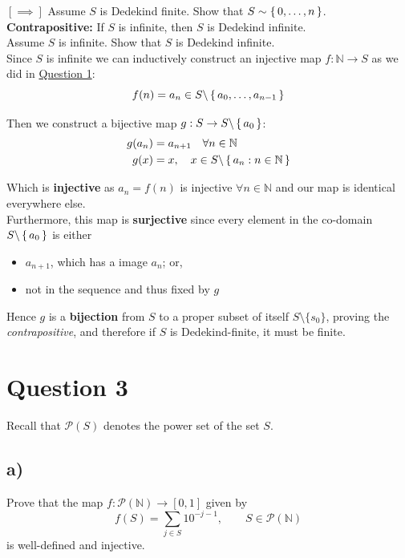 \documentclass[dvipsnames,12pt]{exam}
\newcommand{\N}{{\mathbb{N}}}
\renewcommand{\P}{{\mathcal{P}}} %
\begin{document}
\bigskip

$[\implies]$ Assume $S$ is Dedekind finite. Show that $S \sim \set{0, \ldots, n}$.\\

\textbf{Contrapositive:} If $S$ is infinite, then $S$ is Dedekind infinite.\\

Assume $S$ is infinite. Show that $S$ is Dedekind infinite.\\

Since $S$ is infinite we can inductively construct an injective map $f: \N \to S$ as we did in \hyperref[question1]{Question 1}:
$$f(n) = a_n \in S \backslash \set{a_0,\ldots,a_{n-1}}$$

Then we construct a bijective map $g:S \to S \backslash \set{a_0}$:
\begin{align}
    g(a_n) &= a_{n+1}\quad \forall n \in \N\\
    g(x) &= x, \quad x \in S \backslash \set{a_n: n\in \N}
\end{align}

Which is \textbf{injective} as $a_n = f(n)$ is injective $\forall n\in \N$ and our map is identical everywhere else.\\

Furthermore, this map is \textbf{surjective} since every element in the co-domain $S\backslash \set{a_0}$ is either
\begin{itemize}
    \item $a_{n+1}$, which has a image $a_n$; or,
    \item not in the sequence and thus fixed by $g$
\end{itemize}

Hence $g$ is a \textbf{bijection} from $S$ to a proper subset of itself $S \setminus \{s_0\} $, proving the \emph{contrapositive}, and therefore if \( S \) is Dedekind-finite, it must be finite. \square

\newpage
\section{Question 3}
Recall that $\P(S)$ denotes the power set of the set $S$.
\subsection{a)}\label{part3a}
Prove that the map $f: \P(\N) \to [0,1]$ given by
    \begin{equation}
        f(S) = \sum_{j\in S} 10^{-j-1},\qquad S \in \P(\N)
    \end{equation}
is well-defined and injective.
\end{document}
